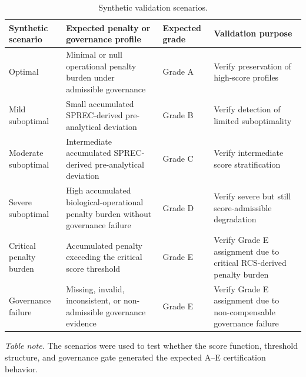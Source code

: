 \documentclass[preprint,12pt]{elsarticle}
\begin{document}
\setcounter{table}{3}
\begin{table}[!htbp]
\caption{Synthetic validation scenarios.}
\label{tab:synthetic_validation_scenarios}
\centering

\footnotesize
\setlength{\tabcolsep}{3pt}
\renewcommand{\arraystretch}{1.08}

\begin{tabular}{@{}L{3.0cm}L{5.2cm}L{2.4cm}L{5.8cm}@{}}

\toprule
\textbf{Synthetic scenario}
& \textbf{Expected penalty or governance profile}
& \textbf{Expected grade}
& \textbf{Validation purpose} \\
\midrule

Optimal
& Minimal or null operational penalty burden under admissible governance
& Grade A
& Verify preservation of high-score profiles \\

Mild suboptimal
& Small accumulated SPREC-derived pre-analytical deviation
& Grade B
& Verify detection of limited suboptimality \\

Moderate suboptimal
& Intermediate accumulated SPREC-derived pre-analytical deviation
& Grade C
& Verify intermediate score stratification \\

Severe suboptimal
& High accumulated biological-operational penalty burden without governance failure
& Grade D
& Verify severe but still score-admissible degradation \\

Critical penalty burden
& Accumulated penalty exceeding the critical score threshold
& Grade E
& Verify Grade E assignment due to critical RCS-derived penalty burden \\

Governance failure
& Missing, invalid, inconsistent, or non-admissible governance evidence
& Grade E
& Verify Grade E assignment due to non-compensable governance failure \\

\bottomrule

\end{tabular}

\vspace{0.4em}

\begin{minipage}{0.95\textwidth}
\footnotesize
\textit{Table note.}
The scenarios were used to test whether the score function, threshold structure, and governance gate generated the expected A--E certification behavior.
\end{minipage}

\end{table}
\end{document}
